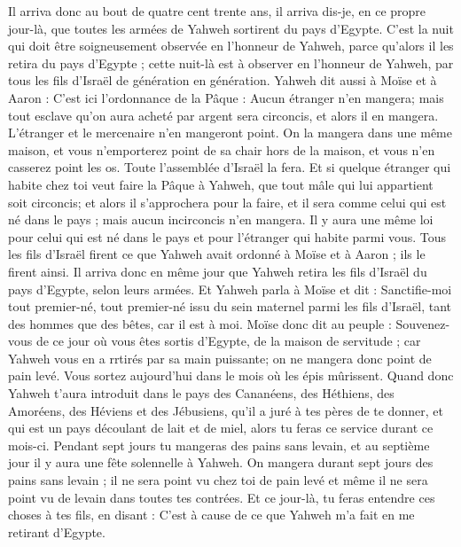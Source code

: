 \begin{multicols}{2}
Il arriva donc au bout de quatre cent trente ans, il arriva dis-je, en ce propre jour-là, que toutes les armées de Yahweh sortirent du pays d'Egypte.
C'est la nuit qui doit être soigneusement observée en l'honneur de Yahweh, parce qu'alors il les retira du pays d'Egypte ; cette nuit-là est à observer en l'honneur de Yahweh, par tous les fils d'Israël de génération en génération.
Yahweh dit aussi à Moïse et à Aaron : C'est ici l'ordonnance de la Pâque : Aucun étranger n'en mangera;
mais tout esclave qu'on aura acheté par argent sera circoncis, et alors il en mangera.
L'étranger et le mercenaire n'en mangeront point.
On la mangera dans une même maison, et vous n'emporterez point de sa chair hors de la maison, et vous n'en casserez point les os.
Toute l'assemblée d'Israël la fera.
Et si quelque étranger qui habite chez toi veut faire la Pâque à Yahweh, que tout mâle qui lui appartient soit circoncis; et alors il s'approchera pour la faire, et il sera comme celui qui est né dans le pays ; mais aucun incirconcis n'en mangera.
Il y aura une même loi pour celui qui est né dans le pays et pour l'étranger qui habite parmi vous.
Tous les fils d'Israël firent ce que Yahweh avait ordonné à Moïse et à Aaron ; ils le firent ainsi.
Il arriva donc en même jour que Yahweh retira les fils d'Israël du pays d'Egypte, selon leurs armées.
\VerseOne{}Et Yahweh parla à Moïse et dit :
Sanctifie-moi tout premier-né, tout premier-né issu du sein maternel parmi les fils d'Israël, tant des hommes que des bêtes, car il est à moi.
Moïse donc dit au peuple : Souvenez-vous de ce jour où vous êtes sortis d'Egypte, de la maison de servitude ; car Yahweh vous en a rrtirés par sa main puissante; on ne mangera donc point de pain levé.
Vous sortez aujourd'hui dans le mois où les épis mûrissent.
Quand donc Yahweh t'aura introduit dans le pays des Cananéens, des Héthiens, des Amoréens, des Héviens et des Jébusiens, qu’il a juré à tes pères de te donner, et qui est un pays découlant de lait et de miel, alors tu feras ce service durant ce mois-ci.
Pendant sept jours tu mangeras des pains sans levain, et au septième jour il y aura une fête solennelle à Yahweh.
On mangera durant sept jours des pains sans levain ; il ne sera point vu chez toi de pain levé et même il ne sera point vu de levain dans toutes tes contrées.
Et ce jour-là, tu feras entendre ces choses à tes fils, en disant : C'est à cause de ce que Yahweh m'a fait  en me retirant d'Egypte.

\end{multicols}
